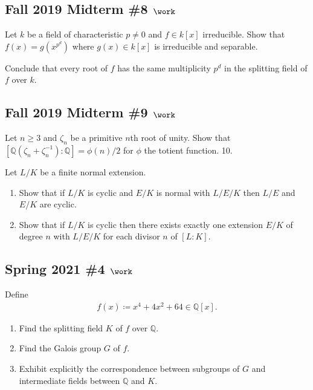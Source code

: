 \hypertarget{fall-2019-midterm-8-work}{%
\subsection{\texorpdfstring{Fall 2019 Midterm \#8
\(\work\)}{Fall 2019 Midterm \#8 \textbackslash work}}\label{fall-2019-midterm-8-work}}

Let \(k\) be a field of characteristic \(p\neq 0\) and \(f\in k[x]\)
irreducible. Show that \(f(x) = g(x^{p^d})\) where \(g(x) \in k[x]\) is
irreducible and separable.

Conclude that every root of \(f\) has the same multiplicity \(p^d\) in
the splitting field of \(f\) over \(k\).

\hypertarget{fall-2019-midterm-9-work}{%
\subsection{\texorpdfstring{Fall 2019 Midterm \#9
\(\work\)}{Fall 2019 Midterm \#9 \textbackslash work}}\label{fall-2019-midterm-9-work}}

Let \(n\geq 3\) and \(\zeta_n\) be a primitive \(n\)th root of unity.
Show that
\([{\mathbb{Q}}(\zeta_n + \zeta_n^{-1}): {\mathbb{Q}}] = \phi(n)/2\) for
\(\phi\) the totient function. 10.

Let \(L/K\) be a finite normal extension.

\begin{enumerate}
\def\labelenumi{\alph{enumi}.}
\item
  Show that if \(L/K\) is cyclic and \(E/K\) is normal with \(L/E/K\)
  then \(L/E\) and \(E/K\) are cyclic.
\item
  Show that if \(L/K\) is cyclic then there exists exactly one extension
  \(E/K\) of degree \(n\) with \(L/E/K\) for each divisor \(n\) of
  \([L:K]\).
\end{enumerate}

\hypertarget{spring-2021-4-work}{%
\subsection{\texorpdfstring{Spring 2021 \#4
\(\work\)}{Spring 2021 \#4 \textbackslash work}}\label{spring-2021-4-work}}

Define
\begin{align*}
f(x) \coloneqq x^4 + 4x^2 + 64 \in {\mathbb{Q}}[x]
.\end{align*}

\begin{enumerate}
\def\labelenumi{\alph{enumi}.}
\item
  Find the splitting field \(K\) of \(f\) over \({\mathbb{Q}}\).
\item
  Find the Galois group \(G\) of \(f\).
\item
  Exhibit explicitly the correspondence between subgroups of \(G\) and
  intermediate fields between \({\mathbb{Q}}\) and \(K\).
\end{enumerate}


